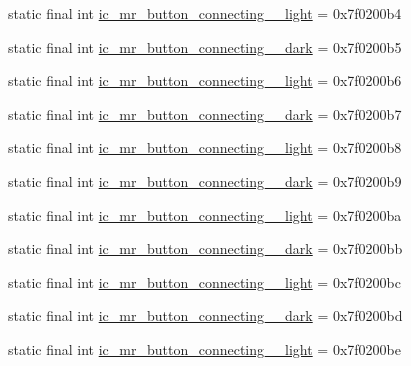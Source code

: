 \begin{CompactItemize}
\item 
static final int \hyperlink{classandroid_1_1support_1_1v7_1_1mediarouter_1_1_r_1_1drawable_92021d824eecf65a21ff7130e9dcae2c}{ic\_\-mr\_\-button\_\-connecting\_\_\-light} = 0x7f0200b4
\item 
static final int \hyperlink{classandroid_1_1support_1_1v7_1_1mediarouter_1_1_r_1_1drawable_12083ba6ec1a4de506b452f8beb77280}{ic\_\-mr\_\-button\_\-connecting\_\_\-dark} = 0x7f0200b5
\item 
static final int \hyperlink{classandroid_1_1support_1_1v7_1_1mediarouter_1_1_r_1_1drawable_63130cd2c1fe4e4b2448ca9917e2236f}{ic\_\-mr\_\-button\_\-connecting\_\_\-light} = 0x7f0200b6
\item 
static final int \hyperlink{classandroid_1_1support_1_1v7_1_1mediarouter_1_1_r_1_1drawable_fa890543092396abd72ba61139c081d6}{ic\_\-mr\_\-button\_\-connecting\_\_\-dark} = 0x7f0200b7
\item 
static final int \hyperlink{classandroid_1_1support_1_1v7_1_1mediarouter_1_1_r_1_1drawable_06a992a98ba671d57c5026ed61b67ad4}{ic\_\-mr\_\-button\_\-connecting\_\_\-light} = 0x7f0200b8
\item 
static final int \hyperlink{classandroid_1_1support_1_1v7_1_1mediarouter_1_1_r_1_1drawable_8f5f3984eab7486ed72c1d42353720ab}{ic\_\-mr\_\-button\_\-connecting\_\_\-dark} = 0x7f0200b9
\item 
static final int \hyperlink{classandroid_1_1support_1_1v7_1_1mediarouter_1_1_r_1_1drawable_342a40cd288d7bab94eaf8241bb6c541}{ic\_\-mr\_\-button\_\-connecting\_\_\-light} = 0x7f0200ba
\item 
static final int \hyperlink{classandroid_1_1support_1_1v7_1_1mediarouter_1_1_r_1_1drawable_6e7f5bce26fc766ddf2589e0248a1fea}{ic\_\-mr\_\-button\_\-connecting\_\_\-dark} = 0x7f0200bb
\item 
static final int \hyperlink{classandroid_1_1support_1_1v7_1_1mediarouter_1_1_r_1_1drawable_48de0e3eb85e872d9e86d7d14e8797ab}{ic\_\-mr\_\-button\_\-connecting\_\_\-light} = 0x7f0200bc
\item 
static final int \hyperlink{classandroid_1_1support_1_1v7_1_1mediarouter_1_1_r_1_1drawable_d6c89cb725dde47a14f18bc1ca821a9f}{ic\_\-mr\_\-button\_\-connecting\_\_\-dark} = 0x7f0200bd
\item 
static final int \hyperlink{classandroid_1_1support_1_1v7_1_1mediarouter_1_1_r_1_1drawable_28db72cddbc1e9770966a2c7bb783a16}{ic\_\-mr\_\-button\_\-connecting\_\_\-light} = 0x7f0200be
\item 

\end{CompactItemize}
